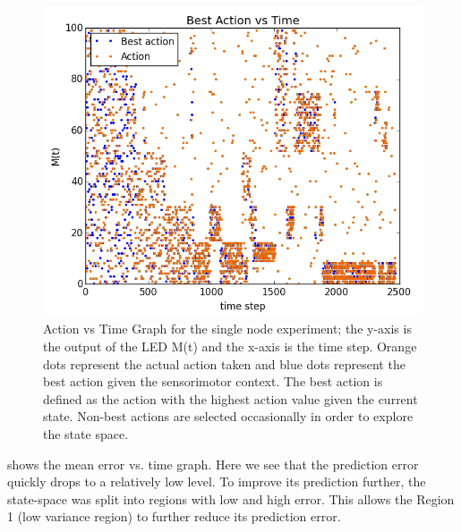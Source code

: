 \begin{figure} [!htbp]
	\centering
	\includegraphics[width=1.0\textwidth]{"fig/validations/LED_ALS Action Selection"}
	\caption[Action vs Time Graph for the single node experiment]{Action vs Time Graph for the single node experiment; the y-axis is the output of the LED M(t) and the x-axis is the time step. Orange dots represent the actual action taken and blue dots represent the best action given the sensorimotor context. The best action is defined as the action with the highest action value given the current state. Non-best actions are selected occasionally in order to explore the state space.}
	\label{fig:LED_ALS Action Selection}
\end{figure}

 shows the mean error vs. time graph. Here we see that the prediction error quickly drops to a relatively low level. To improve its prediction further, the state-space was split into regions with low and high error. This allows the Region 1 (low variance region) to further reduce its prediction error.

